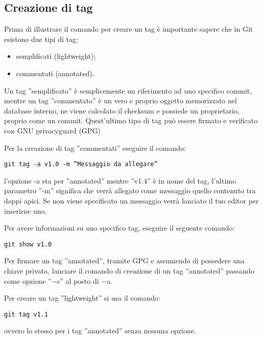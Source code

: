 \subsection{Creazione di tag}
Prima di illustrare il comando per creare un tag è importante sapere che in Git esistono due tipi di tag:

\begin{itemize}
\item semplificati (lightweight);
\item commentati (annotated).
\end{itemize}

Un tag ''semplificato'' è semplicemente un riferimento ad uno specifico commit, mentre un tag ''commentato'' è un vero e proprio oggetto memorizzato nel database interno, ne viene calcolato il checksum e possiede un proprietario, proprio come un commit. Quest'ultimo tipo di tag può essere firmato e verificato con GNU privacyguard (GPG)

Per la creazione di tag ''commentati'' eseguire il comando:

\begin{center}
\texttt{git tag -a v1.0 -m ''Messaggio da allegare''}
\end{center}

l'opzione -a sta per ''annotated'' mentre ''v1.4'' è in nome del tag, l'ultimo parametro ''-m'' significa che verrà allegato come messaggio quello contenuto tra doppi apici. Se non viene specificato un messaggio verrà lanciato il tuo editor per inserirne uno.

Per avere informazioni su uno specifico tag, eseguire il seguente comando:

\begin{center}
\texttt{git show v1.0}
\end{center}

Per firmare un tag ''annotated'', tramite GPG e assumendo di possedere una chiave privata, lanciare il comando di creazione di un tag ''annotated'' passando come opzione ''$-$s'' al posto di $-$a.

Per creare un tag ''lightweight'' si usa il comando:

\begin{center}
\texttt{git tag v1.1}
\end{center}

ovvero lo stesso per i tag ''annotated'' senza nessuna opzione.